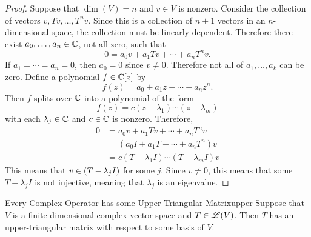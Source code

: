 \documentclass[../AlgebraQualSolutions.tex]{subfiles}
\begin{document}
\begin{proof}
    Suppose that $\dim(V) = n$ and $v \in V$ is nonzero. Consider the collection of vectors $v, Tv, \ldots, T^nv$. Since this is a collection of $n + 1$ vectors in an $n$-dimensional space, the collection must be linearly dependent. Therefore there exist $a_0,\ldots, a_n \in \mathbb{C}$, not all zero, such that
        \[0 = a_0 v + a_1Tv + \cdots + a_n T^n v.\]
    If $a_1 = \cdots = a_n = 0$, then $a_0 = 0$ since $v \neq 0$. Therefore not all of $a_1,\ldots, a_k$ can be zero. Define a polynomial $f \in \mathbb{C}[z]$ by
        \[f(z) = a_0 + a_1z + \cdots + a_nz^n. \]
    Then $f$ splits over $\mathbb{C}$ into a polynomial of the form
        \[f(z) = c(z- \lambda_1)\cdots (z - \lambda_m) \]
    with each $\lambda_j \in \mathbb{C}$ and $c \in \mathbb{C}$ is nonzero. Therefore,
        \begin{align*}
            0 &= a_0 v + a_1Tv + \cdots + a_n T^n v\\
            &= (a_0I + a_1T + \cdots + a_nT^n)v\\
            &= c(T- \lambda_1I)\cdots (T - \lambda_mI)v
        \end{align*}
    This means that $v \in \null(T - \lambda_j I)$ for some $j$. Since $v \neq 0$, this means that some $T - \lambda_j I$ is not injective, meaning that $\lambda_j$ is an eigenvalue.
\end{proof}

\gap

\begin{prop}{Every Complex Operator has some Upper-Triangular Matrix}{upper}
    Suppose that $V$ is a finite dimensional complex vector space and $T \in \mathscr{L}(V)$. Then $T$ has an upper-triangular matrix with respect to some basis of $V$.
\end{prop}
\end{document}
